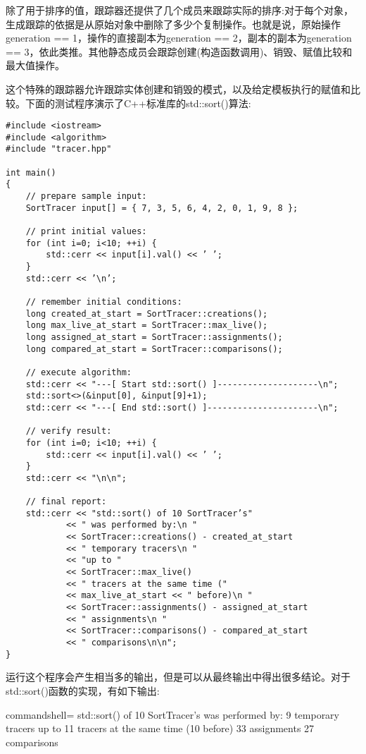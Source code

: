 除了用于排序的值，跟踪器还提供了几个成员来跟踪实际的排序:对于每个对象，生成跟踪的依据是从原始对象中删除了多少个复制操作。也就是说，原始操作generation == 1，操作的直接副本为generation == 2，副本的副本为generation == 3，依此类推。其他静态成员会跟踪创建(构造函数调用)、销毁、赋值比较和最大值操作。

这个特殊的跟踪器允许跟踪实体创建和销毁的模式，以及给定模板执行的赋值和比较。下面的测试程序演示了C++标准库的std::sort()算法:

\begin{lstlisting}[style=styleCXX]
#include <iostream>
#include <algorithm>
#include "tracer.hpp"

int main()
{
	// prepare sample input:
	SortTracer input[] = { 7, 3, 5, 6, 4, 2, 0, 1, 9, 8 };
	
	// print initial values:
	for (int i=0; i<10; ++i) {
		std::cerr << input[i].val() << ’ ’;
	}
	std::cerr << ’\n’;
	
	// remember initial conditions:
	long created_at_start = SortTracer::creations();
	long max_live_at_start = SortTracer::max_live();
	long assigned_at_start = SortTracer::assignments();
	long compared_at_start = SortTracer::comparisons();
	
	// execute algorithm:
	std::cerr << "---[ Start std::sort() ]--------------------\n";
	std::sort<>(&input[0], &input[9]+1);
	std::cerr << "---[ End std::sort() ]----------------------\n";
	
	// verify result:
	for (int i=0; i<10; ++i) {
		std::cerr << input[i].val() << ’ ’;
	}
	std::cerr << "\n\n";
	
	// final report:
	std::cerr << "std::sort() of 10 SortTracer’s"
			<< " was performed by:\n "
			<< SortTracer::creations() - created_at_start
			<< " temporary tracers\n "
			<< "up to "
			<< SortTracer::max_live()
			<< " tracers at the same time ("
			<< max_live_at_start << " before)\n "
			<< SortTracer::assignments() - assigned_at_start
			<< " assignments\n "
			<< SortTracer::comparisons() - compared_at_start
			<< " comparisons\n\n";
}
\end{lstlisting}

运行这个程序会产生相当多的输出，但是可以从最终输出中得出很多结论。对于std::sort()函数的实现，有如下输出:

\begin{tcblisting}{commandshell={}}
std::sort() of 10 SortTracer’s was performed by:
 9 temporary tracers
 up to 11 tracers at the same time (10 before)
 33 assignments
 27 comparisons
\end{tcblisting}

